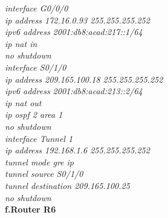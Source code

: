 \documentclass[12pt,a4paper]{report}
\begin{document}
\hspace*{2cm}\textit{interface G0/0/0\\
\hspace*{2cm}ip address 172.16.0.93 255.255.255.252\\
\hspace*{2cm}ipv6 address 2001:db8:acad:217::1/64\\
\hspace*{2cm}ip nat in\\
\hspace*{2cm}no shutdown\\
\hspace*{2cm}interface S0/1/0\\
\hspace*{2cm}ip address 209.165.100.18 255.255.255.252\\
\hspace*{2cm}ipv6 address 2001:db8:acad:213::2/64\\
\hspace*{2cm}ip nat out\\
\hspace*{2cm}ip ospf 2 area 1\\
\hspace*{2cm}no shutdown\\
\hspace*{2cm}interface Tunnel 1\\
\hspace*{2cm}ip address 192.168.1.6 255.255.255.252\\
\hspace*{2cm}tunnel mode gre ip\\
\hspace*{2cm}tunnel source S0/1/0\\
\hspace*{2cm}tunnel destination 209.165.100.25\\
\hspace*{2cm}no shutdown\\}
\hspace*{1cm}\textbf{f.Router R6} \\
\end{document}
